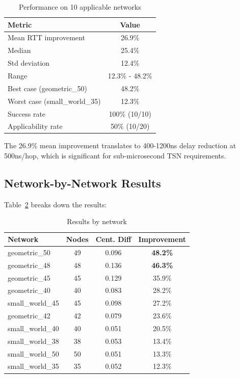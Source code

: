 \documentclass[conference]{IEEEtran}
\begin{document}
\begin{table}[h]
\centering
\caption{Performance on 10 applicable networks}
\label{tab:validated_results}
\small
\begin{tabular}{lc}
\toprule
\textbf{Metric} & \textbf{Value} \\
\midrule
Mean RTT improvement & 26.9\% \\
Median & 25.4\% \\
Std deviation & 12.4\% \\
Range & 12.3\% - 48.2\% \\
\midrule
Best case (geometric\_50) & 48.2\% \\
Worst case (small\_world\_35) & 12.3\% \\
\midrule
Success rate & 100\% (10/10) \\
Applicability rate & 50\% (10/20) \\
\bottomrule
\end{tabular}
\end{table}

The 26.9\% mean improvement translates to 400-1200ns delay reduction at 500ns/hop, which is significant for sub-microsecond TSN requirements.

\subsection{Network-by-Network Results}

Table~\ref{tab:pernetwork} breaks down the results:

\begin{table}[h]
\centering
\caption{Results by network}
\label{tab:pernetwork}
\small
\begin{tabular}{lccc}
\toprule
\textbf{Network} & \textbf{Nodes} & \textbf{Cent. Diff} & \textbf{Improvement} \\
\midrule
geometric\_50 & 49 & 0.096 & \textbf{48.2\%} \\
geometric\_48 & 48 & 0.136 & \textbf{46.3\%} \\
geometric\_45 & 45 & 0.129 & 35.9\% \\
geometric\_40 & 40 & 0.083 & 28.2\% \\
small\_world\_45 & 45 & 0.098 & 27.2\% \\
geometric\_42 & 42 & 0.079 & 23.6\% \\
small\_world\_40 & 40 & 0.051 & 20.5\% \\
small\_world\_38 & 38 & 0.053 & 13.4\% \\
small\_world\_50 & 50 & 0.051 & 13.3\% \\
small\_world\_35 & 35 & 0.052 & 12.3\% \\
\bottomrule
\end{tabular}
\end{table}
\end{document}
